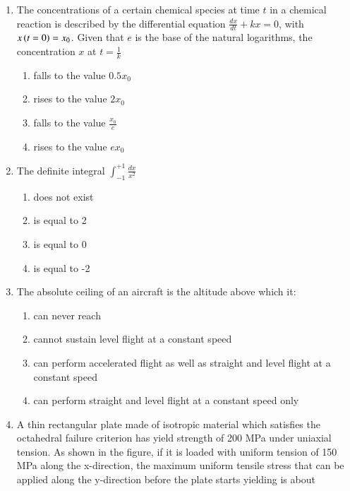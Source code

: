 \documentclass[journal]{IEEEtran}
\begin{document}
\begin{enumerate}[start=1]
         
\item The concentrations of a certain chemical species at time $t$ in a chemical reaction is described by the differential equation $\frac{dx}{dt}+kx=0$, with $x\left(t=0\right)=x_{0}$. Given that $e$ is the base of the natural logarithms, the concentration $x$ at $t=\frac{1}{k}$
       \begin{multicols}{2}
        \begin{enumerate}
        \item falls to the value $0.5x_{0}$
        \item rises to the value $2x_{0}$
        \item falls to the value $\frac{x_{0}}{e}$
        \item rises to the value $ex_{0}$
        \end{enumerate}
        \end{multicols}

\item The definite integral $\int_{-1}^{+1}\frac{dx}{x^{2}}$
\begin{multicols}{4}
    \begin{enumerate}
    \item does not exist
    \item is equal to 2
    \item is equal to 0
    \item is equal to -2
    \end{enumerate}
    \end{multicols}
    
\item The absolute ceiling of an aircraft is the altitude above which it:
    \begin{enumerate}
    \item can never reach
    \item cannot sustain level flight at a constant speed
    \item can perform accelerated flight as well as straight and level flight at a constant speed
    \item can perform straight and level flight at a constant speed only
    \end{enumerate}

\item A thin rectangular plate made of isotropic material which satisfies the octahedral  failure criterion has yield strength of 200 MPa under uniaxial tension. As shown in the figure, if it is loaded with uniform tension of 150 MPa along the x-direction, the maximum uniform tensile stress that can be applied along the y-direction before the plate starts yielding is about


\end{enumerate}
\end{document}
